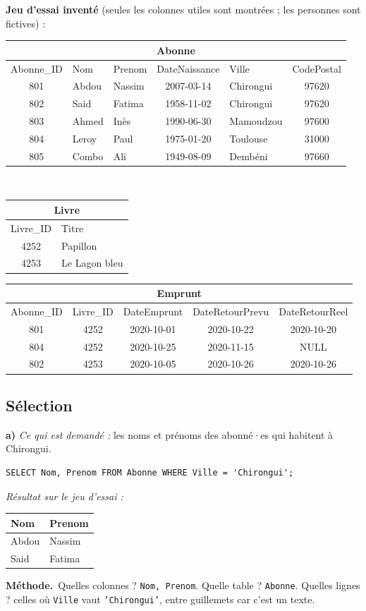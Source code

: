 \documentclass[11pt, a4paper]{exam}
\newcommand{\code}[1]{\texttt{#1}}
\newcommand{\rappel}[1]{\noindent\textit{Ce qui est demandé :} #1\par\smallskip}
\newcommand{\methode}{\noindent\textbf{Méthode.}\ }
\newcommand{\resultat}[1]{\par\smallskip\noindent\textit{Résultat sur le jeu d'essai :}\par\nopagebreak\begin{center}\footnotesize #1\end{center}}
\begin{document}
\textbf{Jeu d'essai inventé} (seules les colonnes utiles sont montrées ; les personnes sont fictives) :
\begin{center}\footnotesize
\begin{tabular}{|c|l|l|c|l|c|}\hline
\multicolumn{6}{|c|}{\textbf{Abonne}}\\\hline
Abonne\_ID & Nom & Prenom & DateNaissance & Ville & CodePostal \\\hline
801 & Abdou & Nassim & 2007-03-14 & Chirongui & 97620 \\
802 & Said & Fatima & 1958-11-02 & Chirongui & 97620 \\
803 & Ahmed & Inès & 1990-06-30 & Mamoudzou & 97600 \\
804 & Leroy & Paul & 1975-01-20 & Toulouse & 31000 \\
805 & Combo & Ali & 1949-08-09 & Dembéni & 97660 \\\hline
\end{tabular}\\[0.5em]
\begin{tabular}{|c|l|}\hline
\multicolumn{2}{|c|}{\textbf{Livre}}\\\hline
Livre\_ID & Titre \\\hline
4252 & Papillon \\
4253 & Le Lagon bleu \\\hline
\end{tabular}\quad
\begin{tabular}{|c|c|c|c|c|}\hline
\multicolumn{5}{|c|}{\textbf{Emprunt}}\\\hline
Abonne\_ID & Livre\_ID & DateEmprunt & DateRetourPrevu & DateRetourReel \\\hline
801 & 4252 & 2020-10-01 & 2020-10-22 & 2020-10-20 \\
804 & 4252 & 2020-10-25 & 2020-11-15 & NULL \\
802 & 4253 & 2020-10-05 & 2020-10-26 & 2020-10-26 \\\hline
\end{tabular}
\end{center}

\subsection*{Sélection}

\textbf{a)} \rappel{les noms et prénoms des abonné·es qui habitent à Chirongui.}
\begin{reponse}
\begin{lstlisting}[style=sqlc]
SELECT Nom, Prenom FROM Abonne WHERE Ville = 'Chirongui';
\end{lstlisting}
\end{reponse}
\resultat{\begin{tabular}{|l|l|}\hline Nom & Prenom \\\hline Abdou & Nassim \\ Said & Fatima \\\hline\end{tabular}}
\methode Quelles colonnes ? \code{Nom, Prenom}. Quelle table ? \code{Abonne}. Quelles lignes ? celles où \code{Ville} vaut \code{'Chirongui'}, entre guillemets car c'est un texte.
\end{document}
